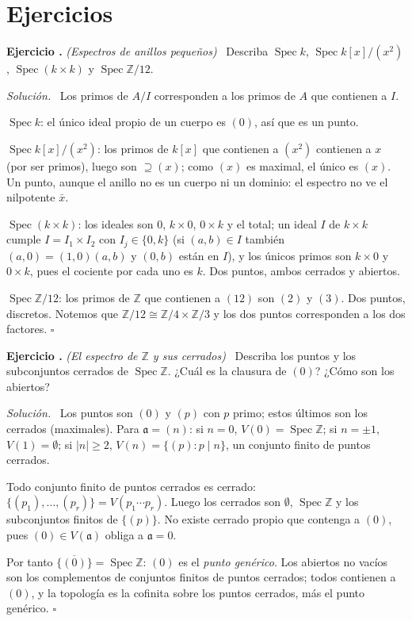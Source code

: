 \documentclass[11pt,a4paper]{article}
\newcommand{\Spec}{\operatorname{Spec}}
\newcommand{\ZZ}{\mathbb{Z}}
\newcounter{ej}
\newenvironment{ejercicio}[1]{\refstepcounter{ej}\par\bigskip\noindent\textbf{Ejercicio \theej.} \emph{(#1)}\ }{\par}
\newenvironment{solucion}{\par\smallskip\noindent\textit{Solución.}\ }{\hfill$\square$\par}
\begin{document}
\section*{Ejercicios}

\begin{ejercicio}{Espectros de anillos pequeños}
Describa $\Spec k$, $\Spec k[x]/(x^2)$, $\Spec(k\times k)$ y $\Spec\ZZ/12$.
\end{ejercicio}
\begin{solucion}
Los primos de $A/I$ corresponden a los primos de $A$ que contienen a $I$.

$\Spec k$: el único ideal propio de un cuerpo es $(0)$, así que es un punto.

$\Spec k[x]/(x^2)$: los primos de $k[x]$ que contienen a $(x^2)$ contienen a $x$ (por ser primos), luego son $\supseteq(x)$; como $(x)$ es maximal, el único es $(x)$. Un punto, aunque el anillo no es un cuerpo ni un dominio: el espectro no ve el nilpotente $\bar x$.

$\Spec(k\times k)$: los ideales son $0$, $k\times0$, $0\times k$ y el total; un ideal $I$ de $k\times k$ cumple $I=I_1\times I_2$ con $I_j\in\{0,k\}$ (si $(a,b)\in I$ también $(a,0)=(1,0)(a,b)$ y $(0,b)$ están en $I$), y los únicos primos son $k\times0$ y $0\times k$, pues el cociente por cada uno es $k$. Dos puntos, ambos cerrados y abiertos.

$\Spec\ZZ/12$: los primos de $\ZZ$ que contienen a $(12)$ son $(2)$ y $(3)$. Dos puntos, discretos. Notemos que $\ZZ/12\cong\ZZ/4\times\ZZ/3$ y los dos puntos corresponden a los dos factores.
\end{solucion}

\begin{ejercicio}{El espectro de $\ZZ$ y sus cerrados}
Describa los puntos y los subconjuntos cerrados de $\Spec\ZZ$. ¿Cuál es la clausura de $(0)$? ¿Cómo son los abiertos?
\end{ejercicio}
\begin{solucion}
Los puntos son $(0)$ y $(p)$ con $p$ primo; estos últimos son los cerrados (maximales). Para $\mathfrak a=(n)$: si $n=0$, $V(0)=\Spec\ZZ$; si $n=\pm1$, $V(1)=\emptyset$; si $|n|\ge2$, $V(n)=\{(p):p\mid n\}$, un conjunto finito de puntos cerrados.

Todo conjunto finito de puntos cerrados es cerrado: $\{(p_1),\dots,(p_r)\}=V(p_1\cdots p_r)$. Luego los cerrados son $\emptyset$, $\Spec\ZZ$ y los subconjuntos finitos de $\{(p)\}$. No existe cerrado propio que contenga a $(0)$, pues $(0)\in V(\mathfrak a)$ obliga a $\mathfrak a=0$.

Por tanto $\overline{\{(0)\}}=\Spec\ZZ$: $(0)$ es el \emph{punto genérico}. Los abiertos no vacíos son los complementos de conjuntos finitos de puntos cerrados; todos contienen a $(0)$, y la topología es la cofinita sobre los puntos cerrados, más el punto genérico.
\end{solucion}
\end{document}
